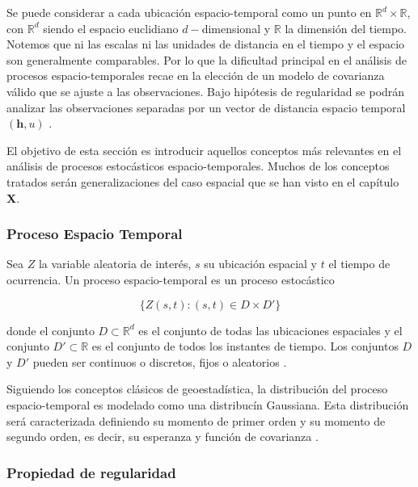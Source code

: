 \documentclass[
]{book}
\begin{document}
Se puede considerar a cada ubicación espacio-temporal como un punto en \(\mathbb{R}^d \times \mathbb{R}\), con \(\mathbb{R}^d\) siendo el espacio euclidiano \(d-\)dimensional y \(\mathbb{R}\) la dimensión del tiempo. Notemos que ni las escalas ni las unidades de distancia en el tiempo y el espacio son generalmente comparables. Por lo que la dificultad principal en el análisis de procesos espacio-temporales recae en la elección de un modelo de covarianza válido que se ajuste a las observaciones. Bajo hipótesis de regularidad se podrán analizar las observaciones separadas por un vector de distancia espacio temporal \((\textbf{h},u)\) \citep{gespt_cas}.

El objetivo de esta sección es introducir aquellos conceptos más relevantes en el análisis de procesos estocásticos espacio-temporales. Muchos de los conceptos tratados serán generalizaciones del caso espacial que se han visto en el capítulo \textbf{X}.

\hypertarget{proceso-espacio-temporal-1}{%
\subsubsection*{Proceso Espacio Temporal}\label{proceso-espacio-temporal-1}}

Sea \(Z\) la variable aleatoria de interés, \(s\) su ubicación espacial y \(t\) el tiempo de ocurrencia. Un proceso espacio-temporal es un proceso estocástico

\[\{Z(s,t):(s,t) \in D \times D' \}\]

donde el conjunto \(D \subset \mathbb{R}^d\) es el conjunto de todas las ubicaciones espaciales y el conjunto \(D' \subset \mathbb{R}\) es el conjunto de todos los instantes de tiempo. Los conjuntos \(D\) y \(D'\) pueden ser continuos o discretos, fijos o aleatorios \citep{marta}.

Siguiendo los conceptos clásicos de geoestadística, la distribución del proceso espacio-temporal es modelado como una distribucín Gaussiana. Esta distribución será caracterizada definiendo su momento de primer orden y su momento de segundo orden, es decir, su esperanza y función de covarianza \citep{montero}.

\hypertarget{propiedad-de-regularidad}{%
\subsubsection*{Propiedad de regularidad}\label{propiedad-de-regularidad}}
\end{document}
